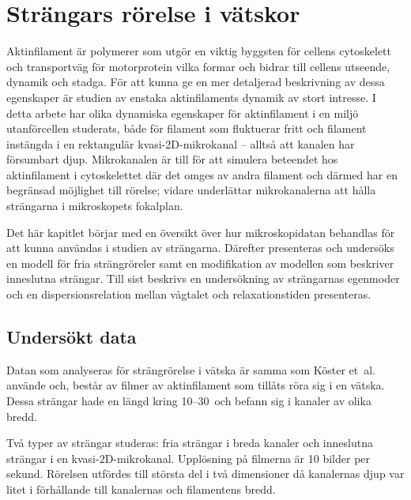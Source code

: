 \chapter{Strängars rörelse i vätskor}

Aktinfilament är polymerer som utgör en viktig byggsten för cellens cytoskelett och transportväg för motorprotein vilka formar och bidrar till cellens utseende, dynamik och stadga. För att kunna ge en mer detaljerad beskrivning av dessa egenskaper är studien av enstaka aktinfilaments dynamik av stort intresse. I detta arbete har olika dynamiska egenskaper för aktinfilament i en miljö utanförcellen studerats, både för filament som fluktuerar fritt och filament instängda i en rektangulär kvasi-2D-mikrokanal -- alltså att kanalen har försumbart djup. Mikrokanalen är till för att simulera beteendet hos aktinfilament i cytoskelettet där det omges av andra filament och därmed har en begränsad möjlighet till rörelse; vidare underlättar mikrokanalerna att hålla strängarna i mikroskopets fokalplan.

Det här kapitlet börjar med en översikt över hur mikroskopidatan behandlas för att kunna användas i studien av strängarna. Därefter presenteras och undersöks en modell för fria strängröreler samt en modifikation av modellen som beskriver inneslutna strängar. Till sist beskrivs en undersökning av strängarnas egenmoder och en dispersionsrelation mellan vågtalet och relaxationstiden presenteras.

\section{Undersökt data}
Datan som analyseras för strängrörelse i vätska är samma som Köster et~al.~\cite{Koster_etal2005,Koster_etal2007} använde och, består av filmer av aktinfilament som tillåts röra sig i en vätska. Dessa strängar hade en längd kring 10--30\, och befann sig i kanaler av olika bredd. %

Två typer av strängar studeras: fria strängar i breda kanaler och inneslutna strängar i en kvasi-2D-mikrokanal. Upplösning på filmerna är 10 bilder per sekund. Rörelsen utfördes till största del i två dimensioner då kanalernas djup var litet i förhållande till kanalernas och filamentens bredd.


